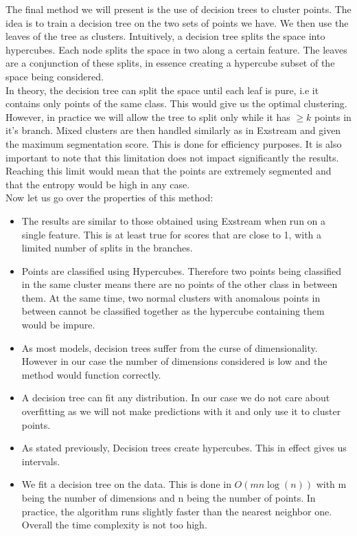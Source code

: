 \documentclass[oneside, a4paper, onecolumn, 11pt]{article}
\begin{document}
The final method we will present is the use of decision trees to cluster points. The idea is to train a decision tree on the two sets of points we have. We then use the leaves of the tree as clusters. Intuitively, a decision tree splits the space into hypercubes. Each node splits the space in two along a certain feature. The leaves are a conjunction of these splits, in essence creating a hypercube subset of the space being considered. \\
In theory, the decision tree can split the space until each leaf is pure, i.e it contains only points of the same class. This would give us the optimal clustering. However, in practice we will allow the tree to split only while it has $\geq k$ points in it's branch. Mixed clusters are then handled similarly as in Exstream and given the maximum segmentation score. This is done for efficiency purposes. It is also important to note that this limitation does not impact significantly the results. Reaching this limit would mean that the points are extremely segmented and that the entropy would be high in any case.\\
Now let us go over the properties of this method: 
\begin{itemize}
  \item The results are similar to those obtained using Exstream when run on a single feature. This is at least true for scores that are close to 1, with a limited number of splits in the branches.
  \item Points are classified using Hypercubes. Therefore two points being classified in the same cluster means there are no points of the other class in between them. At the same time, two normal clusters with anomalous points in between cannot be classified together as the hypercube containing them would be impure.
  \item As most models, decision trees suffer from the curse of dimensionality. However in our case the number of dimensions considered is low and the method would function correctly.
  \item A decision tree can fit any distribution. In our case we do not care about overfitting as we will not make predictions with it and only use it to cluster points.
  \item As stated previously, Decision trees create hypercubes. This in effect gives us intervals.
  \item We fit a decision tree on the data. This is done in $O(m n \log(n))$ with m being the number of dimensions and n being the number of points. In practice, the algorithm runs slightly faster than the nearest neighbor one. Overall the time complexity is not too high.
\end{itemize}
\end{document}
